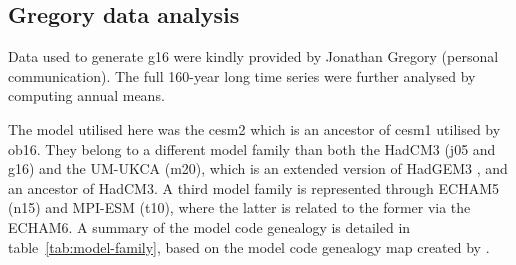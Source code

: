 \documentclass{ametsocV6.1}
\begin{document}
\subsection{Gregory data analysis}\label{ap:g16}

Data used to generate \gls{g16} were kindly provided by Jonathan Gregory (personal
communication). The full 160-year long time series were further analysed by computing
annual means.

\appendix[C]


The model utilised here was the \gls{cesm2} which is an ancestor of \gls{cesm1} utilised
by \gls{ob16}. They belong to a different model family than both the HadCM3 (\gls{j05}
and \gls{g16}) and the UM-UKCA (\gls{m20}), which is an extended version of HadGEM3
\citep{dhomse2014}, and an ancestor of HadCM3. A third model family is represented
through ECHAM5 (\gls{n15}) and MPI-ESM (\gls{t10}), where the latter is related to the
former via the ECHAM6. A summary of the model code genealogy is detailed in
table~\ref{tab:model-family}, based on the model code genealogy map created by
\citet{kuma2023}.
\end{document}
